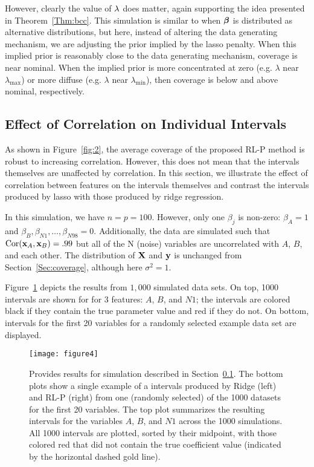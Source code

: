 However, clearly the value of $\lambda$ does matter, again supporting the idea presented in Theorem~\ref{Thm:bcc}. This simulation is similar to when $\boldsymbol{\beta}$ is distributed as alternative distributions, but here, instead of altering the data generating mechanism, we are adjusting the prior implied by the lasso penalty. When this implied prior is reasonably close to the data generating mechanism, coverage is near nominal. When the implied prior is more concentrated at zero (e.g. $\lambda$ near $\lambda_{\max}$) or more diffuse (e.g. $\lambda$ near $\lambda_{\min}$), then coverage is below and above nominal, respectively.

\subsection{Effect of Correlation on Individual Intervals} \label{Sec:Ridge}

As shown in Figure~\ref{fig:2}, the average coverage of the proposed RL-P method is robust to increasing correlation. However, this does not mean that the intervals themselves are unaffected by correlation. In this section, we illustrate the effect of correlation between features on the intervals themselves and contrast the intervals produced by lasso with those produced by ridge regression.

In this simulation, we have $n = p = 100$. However, only one $\beta_j$ is non-zero: $\beta_{A} = 1$ and $\beta_{B}, \beta_{N1}, \ldots, \beta_{N98} = 0$. Additionally, the data are simulated such that $\textrm{Cor}(\mathbf{x}_{A}, \mathbf{x}_{B}) = .99$ but all of the N (noise) variables are uncorrelated with $A$, $B$, and each other. The distribution of $\mathbf{X}$ and $\mathbf{y}$ is unchanged from Section~\ref{Sec:coverage}, although here $\sigma^2 = 1$.

Figure~\ref{fig:4} depicts the results from $1,000$ simulated data sets. On top, 1000 intervals are shown for for 3 features: $A$, $B$, and $N1$; the intervals are colored black if they contain the true parameter value and red if they do not. On bottom, intervals for the first 20 variables for a randomly selected example data set are displayed.

\begin{figure}[htb!]
  \begin{center}
    \texttt{[image: figure4]}
    \caption{\label{fig:4}
      Provides results for simulation described in Section~\ref{Sec:Ridge}. The bottom plots show a single example of a intervals produced by Ridge (left) and RL-P (right) from one (randomly selected) of the 1000 datasets for the first 20 variables. The top plot summarizes the resulting intervals for the variables $A$, $B$, and $N1$ across the 1000 simulations. All 1000 intervals are plotted, sorted by their midpoint, with those colored red that did not contain the true coefficient value (indicated by the horizontal dashed gold line).
    }
  \end{center}
\end{figure}

